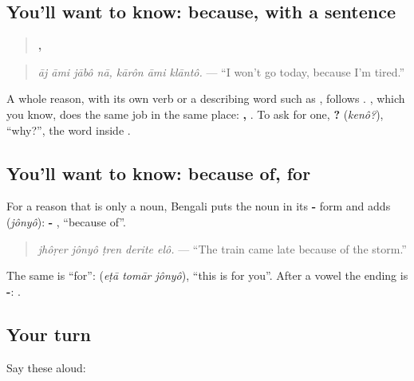 \subsection*{You'll want to know: because, with a sentence}
\begin{quote}
\textbf{   ,   }
\end{quote}

\begin{quote}
\emph{āj āmi jābô nā, kārôn āmi klāntô.} — \textquotedblleft{}I won't go today, because I'm tired.\textquotedblright{}
\end{quote}

A whole reason, with its own verb or a describing word such as \textbf{}, follows \textbf{}. \textbf{}, which you know, does the same job in the same place: \textbf{   ,   }. To ask for one, \textbf{?} (\emph{kenô?}), \textquotedblleft{}why?\textquotedblright{}, the word inside \textbf{}.

\subsection*{You'll want to know: because of, for}
For a reason that is only a noun, Bengali puts the noun in its \textbf{-} form and adds \textbf{} (\emph{jônyô}): \textbf{- }, \textquotedblleft{}because of\textquotedblright{}.

\begin{quote}
\textbf{    }
\end{quote}

\begin{quote}
\emph{jhôṛer jônyô ṭren derite elô.} — \textquotedblleft{}The train came late because of the storm.\textquotedblright{}
\end{quote}

The same \textbf{} is \textquotedblleft{}for\textquotedblright{}: \textbf{  } (\emph{eṭā tomār jônyô}), \textquotedblleft{}this is for you\textquotedblright{}. After a vowel the ending is \textbf{-}: \textbf{ }.

\subsection*{Your turn}
Say these aloud:

